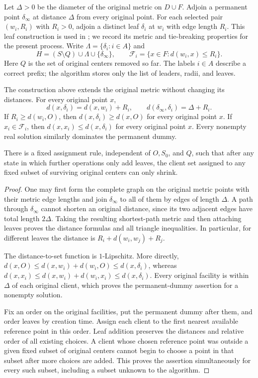 Let $\Delta>0$ be the diameter of the original metric on $D\cup F$.
Adjoin a permanent point $\delta_\infty$ at distance $\Delta$ from every
original point.  For each selected pair $(w_i,R_i)$ with $R_i>0$, adjoin
a distinct leaf $\delta_i$ at $w_i$ with edge length $R_i$.
This leaf construction is used in \cite[Section~4.3.1]{CGLSS2026};
we record its metric and tie-breaking properties for the present process.
Write
$\Lambda=\{\delta_i:i\in A\}$ and
\begin{equation}
 H=(S\setminus Q)\cup\Lambda\cup\{\delta_\infty\},\qquad
 \mathcal F_i=\{x\in F:d(w_i,x)\le R_i\}.
 \label{sam:reference}
\end{equation}
Here $Q$ is the set of original centers removed so far.  The labels $i\in A$
describe a correct prefix; the algorithm stores only the list of leaders,
radii, and leaves.

\begin{lemma}\label{sam:dummy-metric}
The construction above extends the original metric without changing its
distances.  For every original point $x$,
\[
 d(x,\delta_i)=d(x,w_i)+R_i,\qquad
 d(\delta_\infty,\delta_i)=\Delta+R_i.
\]
If $R_i\ge d(w_i,O)$, then $d(x,\delta_i)\ge d(x,O)$ for every original
point $x$.  If $x_i\in\mathcal F_i$, then
$d(x,x_i)\le d(x,\delta_i)$ for every original point $x$.
Every nonempty real solution similarly dominates the permanent dummy.

There is a fixed assignment rule, independent of $O,S_0$, and $Q$, such
that after any state in which further operations only add leaves, the
client set assigned to any fixed subset of surviving original centers can
only shrink.
\end{lemma}

\begin{proof}
One may first form the complete graph on the original metric points with
their metric edge lengths and join $\delta_\infty$ to all of them by edges
of length $\Delta$.  A path through $\delta_\infty$ cannot shorten an
original distance, since its two adjacent edges have total length
$2\Delta$.  Taking the resulting shortest-path metric and then attaching
leaves proves the distance formulas and all triangle inequalities.  In
particular, for different leaves the distance is
$R_i+d(w_i,w_j)+R_j$.

The distance-to-set function is $1$-Lipschitz.  More directly,
$d(x,O)\le d(x,w_i)+d(w_i,O)\le d(x,\delta_i)$, whereas
$d(x,x_i)\le d(x,w_i)+d(w_i,x_i)\le d(x,\delta_i)$.
Every original facility is within $\Delta$ of each original client, which
proves the permanent-dummy assertion for a nonempty solution.

Fix an order on the original facilities, put the permanent dummy after
them, and order leaves by creation time.  Assign each client to the first
nearest available reference point in this order.  Leaf addition preserves
the distances and relative order of all existing choices.  A client whose
chosen reference point was outside a given fixed subset of original
centers cannot begin to choose a point in that subset after more choices
are added.  This proves the assertion simultaneously for every such
subset, including a subset unknown to the algorithm.
\end{proof}

